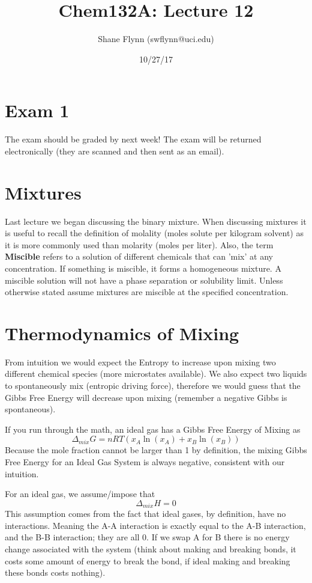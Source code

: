 \documentclass{article}
\title{Chem132A: Lecture 12}
\author{Shane Flynn (swflynn@uci.edu) }
\date{10/27/17}
\newcommand{\be}{\begin{equation}}
\newcommand{\ee}{\end{equation}}
\begin{document}
\maketitle

\section*{Exam 1}
The exam should be graded by next week!
The exam will be returned electronically (they are scanned and then sent as an email). 

\section*{Mixtures}
Last lecture we began discussing the binary mixture. 
When discussing mixtures it is useful to recall the definition of molality (moles solute per kilogram solvent) as it is more commonly used than molarity (moles per liter).
Also, the term \textbf{Miscible} refers to a solution of different chemicals that can 'mix' at any concentration. 
If something is miscible, it forms a homogeneous mixture. 
A miscible solution will not have a phase separation or solubility limit. 
Unless otherwise stated assume mixtures are miscible at the specified concentration. 

\section*{Thermodynamics of Mixing}
From intuition we would expect the Entropy to increase upon mixing two different chemical species (more microstates available). 
We also expect two liquids to spontaneously mix (entropic driving force), therefore we would guess that the Gibbs Free Energy will decrease upon mixing (remember a negative Gibbs is spontaneous). 

If you run through the math, an ideal gas has a Gibbs Free Energy of Mixing as
\be
\Delta_{mix}G = nRT\left(x_A \ln(x_A) + x_B \ln(x_B)\right)
\ee
Because the mole fraction cannot be larger than 1 by definition, the mixing Gibbs Free Energy for an Ideal Gas System is always negative, consistent with our intuition. 

For an ideal gas, we assume/impose that
\be
\Delta_{mix} H = 0
\ee
This assumption comes from the fact that ideal gases, by definition, have no interactions. 
Meaning the A-A interaction is exactly equal to the A-B interaction, and the B-B interaction; they are all 0. 
If we swap A for B there is no energy change associated with the system (think about making and breaking bonds, it costs some amount of energy to break the bond, if ideal making and breaking these bonds costs nothing). 
\end{document}
